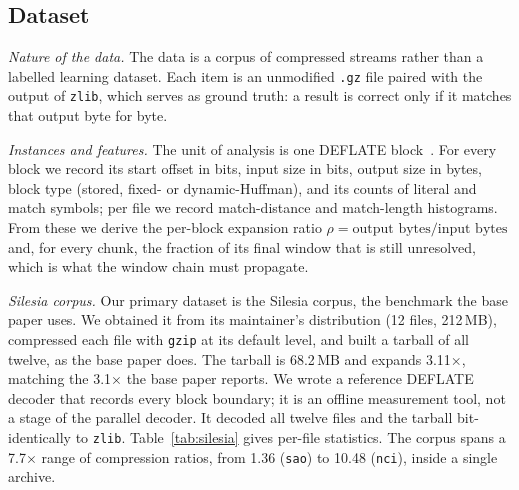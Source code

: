 \documentclass[conference]{IEEEtran}
\begin{document}
\subsection{Dataset}

\emph{Nature of the data.} The data is a corpus of compressed streams rather than
a labelled learning dataset. Each item is an unmodified \texttt{.gz} file paired
with the output of \texttt{zlib}, which serves as ground truth: a result is
correct only if it matches that output byte for byte.

\emph{Instances and features.} The unit of analysis is one DEFLATE
block~\cite{deflate}. For every block we record its start offset in bits, input
size in bits, output size in bytes, block type (stored, fixed- or
dynamic-Huffman), and its counts of literal and match symbols; per file we record
match-distance and match-length histograms. From these we derive the per-block
expansion ratio $\rho = \text{output bytes}/\text{input bytes}$ and, for every
chunk, the fraction of its final window that is still unresolved, which is what
the window chain must propagate.

\emph{Silesia corpus.} Our primary dataset is the Silesia corpus, the benchmark
the base paper uses. We obtained it from its maintainer's distribution
(12 files, 212\,MB), compressed each file with \texttt{gzip} at its default
level, and built a tarball of all twelve, as the base paper does. The tarball is
68.2\,MB and expands 3.11$\times$, matching the 3.1$\times$ the base paper
reports. We wrote a reference DEFLATE decoder that records every block boundary;
it is an offline measurement tool, not a stage of the parallel decoder. It
decoded all twelve files and the tarball bit-identically to \texttt{zlib}.
Table~\ref{tab:silesia} gives per-file statistics. The corpus spans a
7.7$\times$ range of compression ratios, from 1.36 (\texttt{sao}) to 10.48
(\texttt{nci}), inside a single archive.
\end{document}
